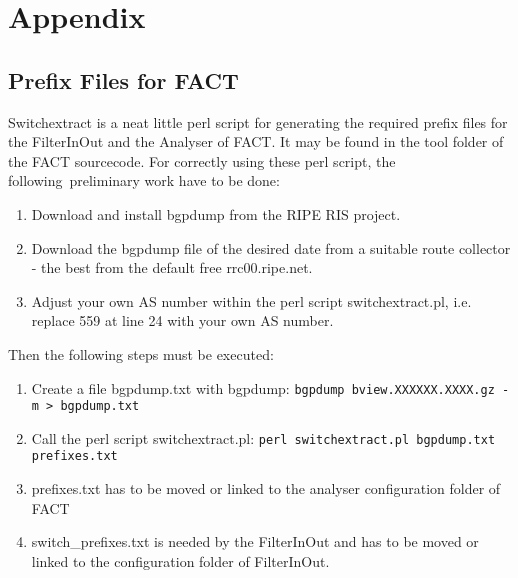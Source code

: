 
\chapter{Appendix}
\label{appendix}
\section{Prefix Files for FACT}

Switchextract is a neat little perl script for generating the required prefix files for the FilterInOut and the Analyser of FACT. It may be found in the tool folder of the FACT sourcecode. For correctly using these perl script, the following preliminary work have to be done:
\begin{enumerate}
	\item Download and install bgpdump from the RIPE RIS project.
	\item Download the bgpdump file of the desired date from a suitable route collector - the best from the default free rrc00.ripe.net.
	\item Adjust your own AS number within the perl script switchextract.pl, i.e. replace 559 at line 24 with your own AS number.
\end{enumerate}

Then the following steps must be executed:
\begin{enumerate}
	\item Create a file bgpdump.txt with bgpdump: \newline\texttt{bgpdump bview.XXXXXX.XXXX.gz -m > bgpdump.txt}
	\item Call the perl script switchextract.pl: \newline\texttt{perl switchextract.pl bgpdump.txt prefixes.txt}
	\item prefixes.txt has to be moved or linked to the analyser configuration folder of FACT
	\item switch\_prefixes.txt is needed by the FilterInOut and has to be moved or linked to the configuration folder of FilterInOut.
\end{enumerate}
